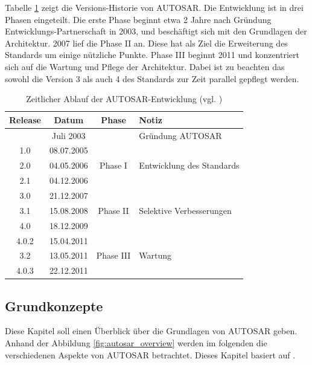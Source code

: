 \documentclass[
  a4paper,					    %
  twoside,
  DIV=calc,     				%
  bibliography=totoc,
  cleardoublepage=empty,
  ngerman,     					%
  final       					%
]{scrbook}
\begin{document}
Tabelle \ref{tab:timeline} zeigt die Versions-Historie von AUTOSAR. Die Entwicklung ist in drei Phasen eingeteilt. Die erste Phase beginnt etwa 2 Jahre nach Gründung Entwicklungs-Partnerschaft in 2003, und beschäftigt sich mit den Grundlagen der Architektur. 2007 lief die Phase II an. Diese hat als Ziel die Erweiterung des Standards um einige nützliche Punkte. Phase III beginnt 2011 und konzentriert sich auf die Wartung und Pflege der Architektur. Dabei ist zu beachten das sowohl die Version 3 als auch 4 des Standards zur Zeit parallel gepflegt werden.

\begin{table}[h]
\center
\begin{tabular}[h]{c c c l}
\toprule
Release & Datum & Phase & Notiz\\
\midrule
      & Juli 2003  &  & Gründung AUTOSAR\\
\midrule
1.0   & 08.07.2005 & \multirow{3}{*}{Phase I} & \\
2.0	  & 04.05.2006 &  & Entwicklung des Standards\\
2.1	  & 04.12.2006 &  & \\
\midrule
3.0	  & 21.12.2007 & \multirow{3}{*}{Phase II} & \\
3.1	  & 15.08.2008 &  & Selektive Verbesserungen\\
4.0	  & 18.12.2009 &  & \\
\midrule
4.0.2 & 15.04.2011 & \multirow{3}{*}{Phase III} & \\
3.2	  & 13.05.2011 &  & Wartung\\
4.0.3 & 22.12.2011 &  & \\
\bottomrule
\end{tabular}
\caption{Zeitlicher Ablauf der AUTOSAR-Entwicklung (vgl. \cite{wiki:autosar_de}\cite{as_roadmap}\cite{as_background})}
\label{tab:timeline}
\end{table}








\subsection{Grundkonzepte}
\label{sec:Grundkonzepte}
Diese Kapitel soll einen Überblick über die Grundlagen von AUTOSAR geben. Anhand der Abbildung \ref{fig:autosar_overview} werden im folgenden die verschiedenen Aspekte von AUTOSAR betrachtet. Dieses Kapitel basiert auf \cite{autosar_techoverview}.
\end{document}
